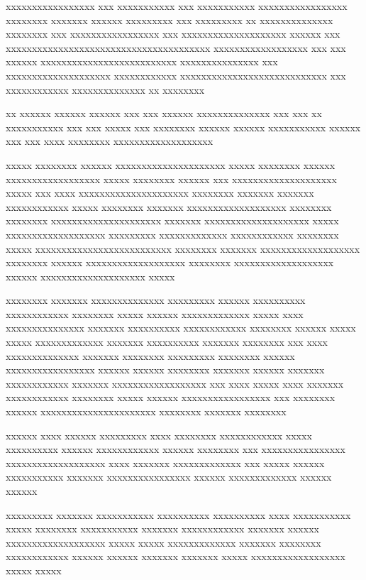 %
\begin{preface}
xxxxxxxxxxxxxxxxx xxx xxxxxxxxxxx
xxx xxxxxxxxxxx xxxxxxxxxxxxxxxxx xxxxxxxx xxxxxxx xxxxxx xxxxxxxxx xxx xxxxxxxxx xx xxxxxxxxxxxxxx xxxxxxxx xxx xxxxxxxxxxxxxxxxx xxx xxxxxxxxxxxxxxxxxxxx xxxxxx xxx xxxxxxxxxxxxxxxxxxxxxxxxxxxxxxxxxxxxxxx xxxxxxxxxxxxxxxxxx xxx xxx xxxxxx xxxxxxxxxxxxxxxxxxxxxxxxxx xxxxxxxxxxxxxxx xxx xxxxxxxxxxxxxxxxxxxx xxxxxxxxxxxx xxxxxxxxxxxxxxxxxxxxxxxxxxxx xxx xxxxxxxxxxxx xxxxxxxxxxxxxx xx xxxxxxxx

xx xxxxxx xxxxxx xxxxxx xxx xxx xxxxxx xxxxxxxxxxxxxx xxx xxx xx xxxxxxxxxxx xxx xxx xxxxx xxx xxxxxxxx xxxxxx xxxxxx xxxxxxxxxxx xxxxxx xxx xxx xxxx xxxxxxxx
xxxxxxxxxxxxxxxxxxx

xxxxx xxxxxxxx xxxxxx xxxxxxxxxxxxxxxxxxxxx xxxxx xxxxxxxx xxxxxx xxxxxxxxxxxxxxxxxx xxxxx xxxxxxxx xxxxxx xxx xxxxxxxxxxxxxxxxxxxx xxxxx xxx xxxx xxxxxxxxxxxxxxxxxxxxx xxxxxxxx xxxxxxx xxxxxxx	xxxxxxxxxxxx xxxxx xxxxxxxx xxxxxxx xxxxxxxxxxxxxxxxxxx xxxxxxxx xxxxxxxx xxxxxxxxxxxxxxxxxxxxx xxxxxxx xxxxxxxxxxxxxxxxxxxx xxxxx xxxxxxxxxxxxxxxxxxx xxxxxxxxx xxxxxxxxxxxxx	xxxxxxxxxxxx xxxxxxxx xxxxx xxxxxxxxxxxxxxxxxxxxxxxxxx xxxxxxxx xxxxxxx xxxxxxxxxxxxxxxxxxx xxxxxxxx xxxxxx xxxxxxxxxxxxxxxxxxx xxxxxxxx xxxxxxxxxxxxxxxxxxx xxxxxx xxxxxxxxxxxxxxxxxxxx  xxxxx

xxxxxxxx xxxxxxx xxxxxxxxxxxxxx xxxxxxxxx xxxxxx xxxxxxxxxx	xxxxxxxxxxxx xxxxxxxx xxxxx xxxxxx xxxxxxxxxxxxx xxxxx xxxx xxxxxxxxxxxxxxx xxxxxxx xxxxxxxxxx xxxxxxxxxxxx xxxxxxxx xxxxxx xxxxx xxxxx xxxxxxxxxxxxx xxxxxxx xxxxxxxxxx xxxxxxx xxxxxxxx xxx xxxx xxxxxxxxxxxxxx xxxxxxx xxxxxxxx xxxxxxxxx xxxxxxxx xxxxxx xxxxxxxxxxxxxxxxx xxxxxx xxxxxx xxxxxxxx xxxxxxx xxxxxx xxxxxxx	xxxxxxxxxxxx xxxxxxx xxxxxxxxxxxxxxxxxx xxx xxxx xxxxx xxxx xxxxxxx	xxxxxxxxxxxx xxxxxxxx xxxxx xxxxxx xxxxxxxxxxxxxxxxx xxx xxxxxxxx xxxxxx xxxxxxxxxxxxxxxxxxxxxx xxxxxxxx xxxxxxx xxxxxxxx

xxxxxx xxxx xxxxxx xxxxxxxxx xxxx xxxxxxxx xxxxxxxxxxxx xxxxx xxxxxxxxxx xxxxxx xxxxxxxxxxxx xxxxxx xxxxxxxx xxx xxxxxxxxxxxxxxxx xxxxxxxxxxxxxxxxxxx xxxx xxxxxxx xxxxxxxxxxxxx xxx xxxxx xxxxxx xxxxxxxxxxx xxxxxxx xxxxxxxxxxxxxxxx xxxxxx xxxxxxxxxxxxx xxxxxx xxxxxx

xxxxxxxxx xxxxxxx xxxxxxxxxxx xxxxxxxxxx xxxxxxxxxx xxxx xxxxxxxxxxx xxxxx xxxxxxxx xxxxxxxxxxx xxxxxxx xxxxxxxxxxxx xxxxxxx xxxxxx xxxxxxxxxxxxxxxxxxx xxxxx xxxxx xxxxxxxxxxxxx xxxxxxx xxxxxxxx xxxxxxxxxxxx xxxxxx xxxxxx xxxxxxx xxxxxxx xxxxx xxxxxxxxxxxxxxxxxx xxxxx xxxxx


\end{preface}
